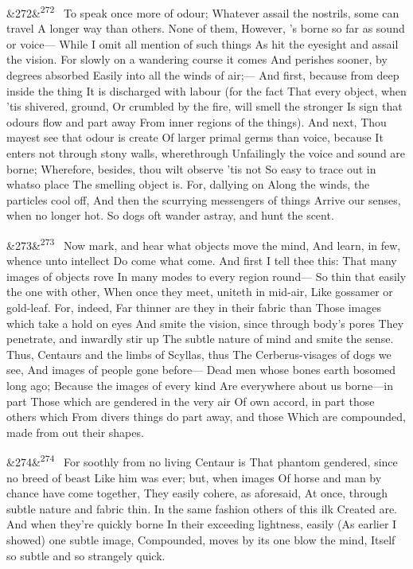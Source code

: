 \documentclass[12pt]{article}
\newcommand{\para}[1][]{\par\noindent\ifx&#1&\else\textsuperscript{\footnotesize #1}~\fi}
\begin{document}
\para[272] To speak once more of odour; Whatever assail the nostrils, some can travel A longer way than others. None of them, However, 's borne so far as sound or voice--- While I omit all mention of such things As hit the eyesight and assail the vision. For slowly on a wandering course it comes And perishes sooner, by degrees absorbed Easily into all the winds of air;--- And first, because from deep inside the thing It is discharged with labour (for the fact That every object, when 'tis shivered, ground, Or crumbled by the fire, will smell the stronger Is sign that odours flow and part away From inner regions of the things). And next, Thou mayest see that odour is create Of larger primal germs than voice, because It enters not through stony walls, wherethrough Unfailingly the voice and sound are borne; Wherefore, besides, thou wilt observe 'tis not So easy to trace out in whatso place The smelling object is. For, dallying on Along the winds, the particles cool off, And then the scurrying messengers of things Arrive our senses, when no longer hot. So dogs oft wander astray, and hunt the scent.

\para[273] Now mark, and hear what objects move the mind, And learn, in few, whence unto intellect Do come what come. And first I tell thee this: That many images of objects rove In many modes to every region round--- So thin that easily the one with other, When once they meet, uniteth in mid-air, Like gossamer or gold-leaf. For, indeed, Far thinner are they in their fabric than Those images which take a hold on eyes And smite the vision, since through body's pores They penetrate, and inwardly stir up The subtle nature of mind and smite the sense. Thus, Centaurs and the limbs of Scyllas, thus The Cerberus-visages of dogs we see, And images of people gone before--- Dead men whose bones earth bosomed long ago; Because the images of every kind Are everywhere about us borne---in part Those which are gendered in the very air Of own accord, in part those others which From divers things do part away, and those Which are compounded, made from out their shapes.

\para[274] For soothly from no living Centaur is That phantom gendered, since no breed of beast Like him was ever; but, when images Of horse and man by chance have come together, They easily cohere, as aforesaid, At once, through subtle nature and fabric thin. In the same fashion others of this ilk Created are. And when they're quickly borne In their exceeding lightness, easily (As earlier I showed) one subtle image, Compounded, moves by its one blow the mind, Itself so subtle and so strangely quick.
\end{document}
